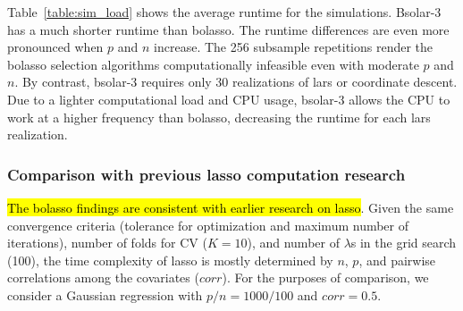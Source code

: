 \documentclass[11pt,review,authoryear]{elsarticle}
\begin{document}
\begin{table}[ht]
%
\centering
%
\caption{Simulation results for computation load (mean runtime in seconds).\label{table:sim_load}}
\smallskip
%
\end{table}

Table~\ref{table:sim_load} shows the average runtime for the simulations. Bsolar-3 has a much shorter runtime than bolasso. The runtime differences are even more pronounced when $p$ and $n$ increase. The 256 subsample repetitions render the bolasso selection algorithms computationally infeasible even with moderate $p$ and $n$. By contrast, bsolar-3 requires only 30 realizations of lars or coordinate descent. Due to a lighter computational load and CPU usage, bsolar-3 allows the CPU to work at a higher frequency than bolasso, decreasing the runtime for each lars realization.

\subsubsection{Comparison with previous lasso computation research}

\hl{The bolasso findings are consistent with earlier research on lasso}. Given the same convergence criteria (tolerance for optimization and maximum number of iterations), number of folds for CV ($K=10$), and number of $\lambda$s in the grid search (100), the time complexity of lasso is mostly determined by $n$, $p$, and pairwise correlations among the covariates ($corr$). For the purposes of comparison, we consider a Gaussian regression with $p/n=1000/100$ and $corr=0.5$.
\end{document}

